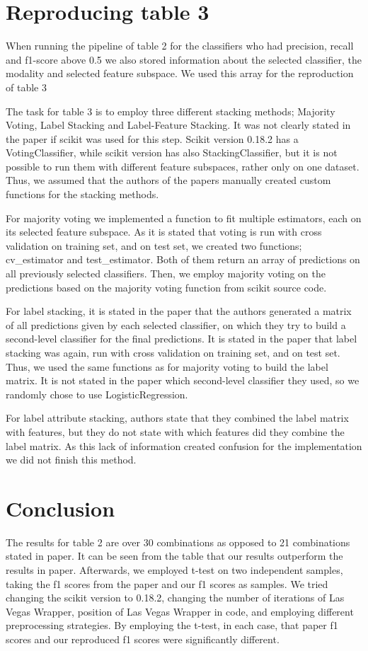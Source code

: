 \documentclass[sigconf]{acmart}
\begin{document}
\section{Reproducing table 3}
When running the pipeline of table 2 for the classifiers who had precision, recall and f1-score above 0.5 we also stored information about the selected classifier, the modality and selected feature subspace. We used this array for the reproduction of table 3

The task for table 3 is to employ three different stacking methods; Majority Voting, Label Stacking and Label-Feature Stacking. It was not clearly stated in the paper if scikit was used for this step. Scikit version 0.18.2 has a VotingClassifier, while scikit version has also StackingClassifier, but it is not possible to run them with different feature subspaces, rather only on one dataset. Thus, we assumed that the authors of the papers manually created custom functions for the stacking methods.

For majority voting we implemented a function to fit multiple estimators, each on its selected feature subspace. As it is stated that voting is run with cross validation on training set, and on test set, we created two functions; cv\_estimator and test\_estimator. Both of them return an array of predictions on all previously selected classifiers. Then, we employ majority voting on the predictions based on the majority voting function from scikit source code.

For label stacking, it is stated in the paper that the authors generated a matrix of all predictions given by each selected classifier, on which they try to build a second-level classifier for the final predictions. It is stated in the paper that label stacking was again, run with cross validation on training set, and on test set. Thus, we used the same functions as for majority voting to build the label matrix. It is not stated in the paper which second-level classifier they used, so we randomly chose to use LogisticRegression.

For label attribute stacking, authors state that they combined the label matrix with features, but they do not state with which features did they combine the label matrix. As this lack of information created confusion for the implementation we did not finish this method.

\section{Conclusion}
The results for table 2 are over 30 combinations as opposed to 21 combinations stated in paper. It can be seen from the table that our results outperform the results in paper.
Afterwards, we employed t-test on two independent samples, taking the f1 scores from the paper and our f1 scores as samples. We tried changing the scikit version to 0.18.2, changing the number of  iterations of Las Vegas Wrapper, position of Las Vegas Wrapper in code, and employing different preprocessing strategies. By employing the t-test, in each case, that paper f1 scores and our reproduced f1 scores were significantly different.
\end{document}
